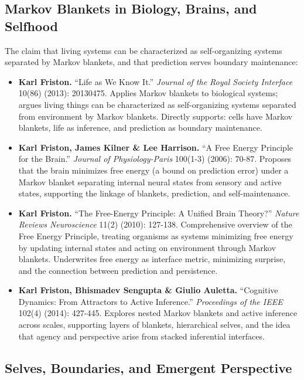 \documentclass[
  openright]{book}
\begin{document}
\subsection{Markov Blankets in Biology, Brains, and
Selfhood}\label{markov-blankets-in-biology-brains-and-selfhood}

The claim that living systems can be characterized as self-organizing
systems separated by Markov blankets, and that prediction serves
boundary maintenance:

\begin{itemize}
\item
  \textbf{Karl Friston.} ``Life as We Know It.'' \emph{Journal of the
  Royal Society Interface} 10(86) (2013): 20130475. Applies Markov
  blankets to biological systems; argues living things can be
  characterized as self-organizing systems separated from environment by
  Markov blankets. Directly supports: cells have Markov blankets, life
  as inference, and prediction as boundary maintenance.
\item
  \textbf{Karl Friston, James Kilner \& Lee Harrison.} ``A Free Energy
  Principle for the Brain.'' \emph{Journal of Physiology-Paris} 100(1-3)
  (2006): 70-87. Proposes that the brain minimizes free energy (a bound
  on prediction error) under a Markov blanket separating internal neural
  states from sensory and active states, supporting the linkage of
  blankets, prediction, and self-maintenance.
\item
  \textbf{Karl Friston.} ``The Free-Energy Principle: A Unified Brain
  Theory?'' \emph{Nature Reviews Neuroscience} 11(2) (2010): 127-138.
  Comprehensive overview of the Free Energy Principle, treating
  organisms as systems minimizing free energy by updating internal
  states and acting on environment through Markov blankets. Underwrites
  free energy as interface metric, minimizing surprise, and the
  connection between prediction and persistence.
\item
  \textbf{Karl Friston, Bhismadev Sengupta \& Giulio Auletta.}
  ``Cognitive Dynamics: From Attractors to Active Inference.''
  \emph{Proceedings of the IEEE} 102(4) (2014): 427-445. Explores nested
  Markov blankets and active inference across scales, supporting layers
  of blankets, hierarchical selves, and the idea that agency and
  perspective arise from stacked inferential interfaces.
\end{itemize}

\subsection{Selves, Boundaries, and Emergent
Perspective}\label{selves-boundaries-and-emergent-perspective}
\end{document}
